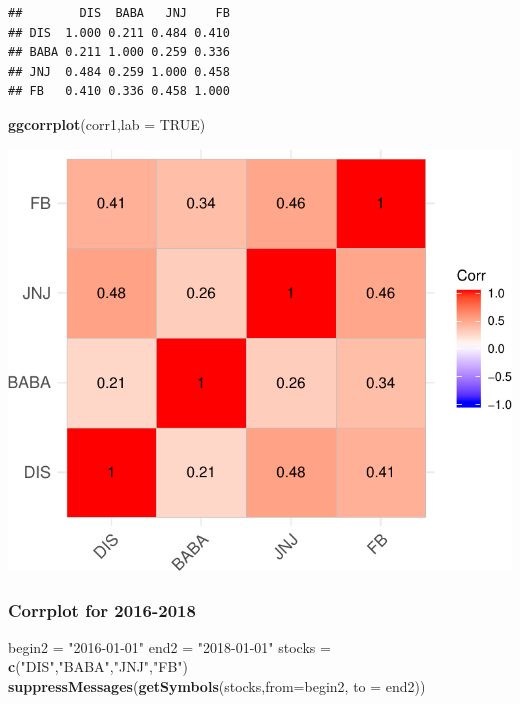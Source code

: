 \documentclass[]{article}
\newenvironment{Shaded}{\begin{snugshade}}{\end{snugshade}}
\newcommand{\KeywordTok}[1]{\textcolor[rgb]{0.13,0.29,0.53}{\textbf{#1}}}
\newcommand{\DataTypeTok}[1]{\textcolor[rgb]{0.13,0.29,0.53}{#1}}
\newcommand{\StringTok}[1]{\textcolor[rgb]{0.31,0.60,0.02}{#1}}
\newcommand{\OtherTok}[1]{\textcolor[rgb]{0.56,0.35,0.01}{#1}}
\newcommand{\NormalTok}[1]{#1}
\begin{document}
\begin{verbatim}
##        DIS  BABA   JNJ    FB
## DIS  1.000 0.211 0.484 0.410
## BABA 0.211 1.000 0.259 0.336
## JNJ  0.484 0.259 1.000 0.458
## FB   0.410 0.336 0.458 1.000
\end{verbatim}

\begin{Shaded}
\begin{Highlighting}[]
\KeywordTok{ggcorrplot}\NormalTok{(corr1,}\DataTypeTok{lab =} \OtherTok{TRUE}\NormalTok{)}
\end{Highlighting}
\end{Shaded}

\includegraphics{Markowitz_Research_Me_files/figure-latex/unnamed-chunk-5-1.pdf}

\subsubsection{Corrplot for 2016-2018}\label{corrplot-for-2016-2018}

\begin{Shaded}
\begin{Highlighting}[]
\NormalTok{begin2 =}\StringTok{ "2016-01-01"}
\NormalTok{end2 =}\StringTok{ "2018-01-01"}
\NormalTok{stocks =}\StringTok{ }\KeywordTok{c}\NormalTok{(}\StringTok{"DIS"}\NormalTok{,}\StringTok{"BABA"}\NormalTok{,}\StringTok{"JNJ"}\NormalTok{,}\StringTok{"FB"}\NormalTok{)}
\KeywordTok{suppressMessages}\NormalTok{(}\KeywordTok{getSymbols}\NormalTok{(stocks,}\DataTypeTok{from=}\NormalTok{begin2, }\DataTypeTok{to =}\NormalTok{ end2))}
\end{Highlighting}
\end{Shaded}
\end{document}
